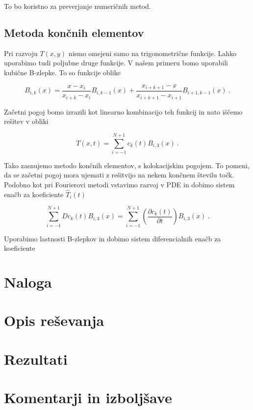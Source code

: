 \documentclass[a4paper]{article}
\begin{document}
To bo koristno za preverjanje numeričnih metod.\\
\subsection{Metoda končnih elementov}
Pri razvoju $T(x,y)$ nismo omejeni samo na trigonometrične funkcije. Lahko uporabimo tudi
poljubne druge funkcije. V našem primeru bomo uporabili kubične B-zlepke. To so funkcije
oblike

\begin{equation}
    B_{i, k}(x) = \frac{x-x_i}{x_{i+k}-x_i}B_{i, k-1}(x) + \frac{x_{i+k+1}-x}{x_{i+k+1}-x_{i+1}}B_{i+1, k-1}(x)\>.
\end{equation}

Začetni pogoj bomo izrazili kot linearno kombinacijo teh funkcij in nato iščemo rešitev
v obliki

\begin{equation}
    T(x, t) = \sum_{i=-1}^{N+1}{c_k(t)B_{i, 3}(x)}\>.
\end{equation}

Tako zasnujemo metodo končnih elementov, s kolokacijskim pogojem. To pomeni, da se začetni
pogoj mora ujemati z rešitvijo na nekem končnem številu točk. Podobno kot pri Fourierovi metodi
vstavimo razvoj v PDE in dobimo sistem enačb za koeficiente $\hat{T}_i(t)$

\begin{equation}
    \sum_{i=-1}^{N+1}{D c_k(t)B_{i, 3}(x)} = 
    \sum_{i=-1}^{N+1}{\left(\frac{\partial c_k(t)}{\partial t}\right)B_{i, 3}(x)}\>.
\end{equation}

Uporabimo lastnosti B-zlepkov in dobimo sistem diferencialnih enačb za koeficiente



\section{Naloga}

\section{Opis reševanja}

\section{Rezultati}


\section{Komentarji in izboljšave}

\newpage


\end{document}
